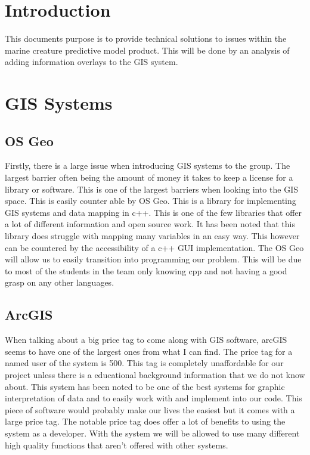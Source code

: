 \documentclass[onecolumn, draftclsnofoot,10pt, compsoc]{IEEEtran}
\begin{document}
        
      \pagebreak
        \section{Introduction}
    This documents purpose is to provide technical solutions to issues within the marine creature predictive model product. This will be done by an analysis of adding information overlays to the GIS system.
      \section{GIS Systems}
      \subsection{OS Geo}
        Firstly, there is a large issue when introducing GIS systems to the group. The largest barrier often being the amount of money it takes to keep a license for a library or software. This is one of the largest barriers when looking into the GIS space. This is easily counter able by OS Geo. This is a library for implementing GIS systems and data mapping in c++. This is one of the few libraries that offer a lot of different information and open source work. It has been noted that this library does struggle with mapping many variables in an easy way. This however can be countered by the accessibility of a c++ GUI implementation. The OS Geo will allow us to easily transition into programming our problem. This will be due to most of the students in the team only knowing cpp and not having a good grasp on any other languages. 
      \subsection{ArcGIS}
        When talking about a big price tag to come along with GIS software, arcGIS seems to have one of the largest ones from what I can find. The price tag for a named user of the system is 500. This tag is completely unaffordable for our project unless there is a educational background information that we do not know about. This system has been noted to be one of the best systems for graphic interpretation of data and to easily work with and implement into our code. This piece of software would probably make our lives the easiest but it comes with a large price tag. The notable price tag does offer a lot of benefits to using the system as a developer. With the system we will be allowed to use many different high quality functions that aren't offered with other systems.
\end{document}
